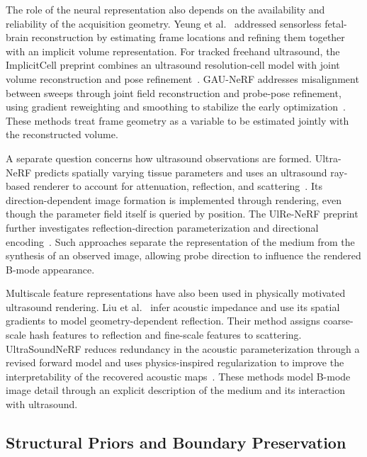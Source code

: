 The role of the neural representation also depends on the availability and reliability of the acquisition geometry. Yeung et al.~\cite{yeung2024sensorless} addressed sensorless fetal-brain reconstruction by estimating frame locations and refining them together with an implicit volume representation. For tracked freehand ultrasound, the ImplicitCell preprint combines an ultrasound resolution-cell model with joint volume reconstruction and pose refinement~\cite{song2025implicitcell}. GAU-NeRF addresses misalignment between sweeps through joint field reconstruction and probe-pose refinement, using gradient reweighting and smoothing to stabilize the early optimization~\cite{dou2026gau}. These methods treat frame geometry as a variable to be estimated jointly with the reconstructed volume.

A separate question concerns how ultrasound observations are formed. Ultra-NeRF predicts spatially varying tissue parameters and uses an ultrasound ray-based renderer to account for attenuation, reflection, and scattering~\cite{wysocki2024ultranerf}. Its direction-dependent image formation is implemented through rendering, even though the parameter field itself is queried by position. The UlRe-NeRF preprint further investigates reflection-direction parameterization and directional encoding~\cite{guo2024ulre}. Such approaches separate the representation of the medium from the synthesis of an observed image, allowing probe direction to influence the rendered B-mode appearance.

Multiscale feature representations have also been used in physically motivated ultrasound rendering. Liu et al.~\cite{liu2026geometry} infer acoustic impedance and use its spatial gradients to model geometry-dependent reflection. Their method assigns coarse-scale hash features to reflection and fine-scale features to scattering. UltraSoundNeRF reduces redundancy in the acoustic parameterization through a revised forward model and uses physics-inspired regularization to improve the interpretability of the recovered acoustic maps~\cite{wysocki2026usnerf}. These methods model B-mode image detail through an explicit description of the medium and its interaction with ultrasound.

\subsection{Structural Priors and Boundary Preservation}

